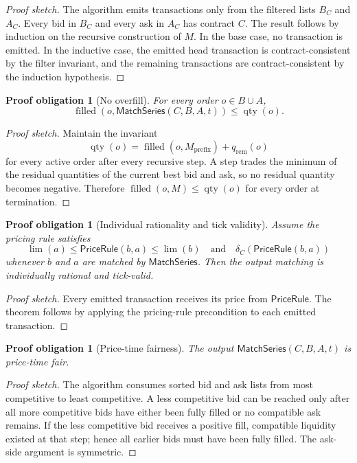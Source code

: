 \documentclass[11pt]{article}
\newtheorem{proofobligation}[definition]{Proof obligation}
\newcommand{\filled}{\operatorname{filled}}
\newcommand{\limitp}{\operatorname{lim}}
\newcommand{\qty}{\operatorname{qty}}
\begin{document}
\begin{proof}[Proof sketch]
The algorithm emits transactions only from the filtered lists \(B_C\) and \(A_C\). Every bid in \(B_C\) and every ask in \(A_C\) has contract \(C\). The result follows by induction on the recursive construction of \(M\). In the base case, no transaction is emitted. In the inductive case, the emitted head transaction is contract-consistent by the filter invariant, and the remaining transactions are contract-consistent by the induction hypothesis.
\end{proof}

\begin{proofobligation}[No overfill]
For every order \(o\in B\cup A\),
\[
\filled(o,\mathsf{MatchSeries}(C,B,A,t))\le \qty(o).
\]
\end{proofobligation}

\begin{proof}[Proof sketch]
Maintain the invariant
\[
\qty(o)=\filled(o,M_{\mathrm{prefix}})+q_{\mathrm{rem}}(o)
\]
for every active order after every recursive step. A step trades the minimum of the residual quantities of the current best bid and ask, so no residual quantity becomes negative. Therefore \(\filled(o,M)\le\qty(o)\) for every order at termination.
\end{proof}

\begin{proofobligation}[Individual rationality and tick validity]
Assume the pricing rule satisfies
\[
\limitp(a)\le\mathsf{PriceRule}(b,a)\le\limitp(b)
\quad\text{and}\quad
\delta_C(\mathsf{PriceRule}(b,a))
\]
whenever \(b\) and \(a\) are matched by \(\mathsf{MatchSeries}\). Then the output matching is individually rational and tick-valid.
\end{proofobligation}

\begin{proof}[Proof sketch]
Every emitted transaction receives its price from \(\mathsf{PriceRule}\). The theorem follows by applying the pricing-rule precondition to each emitted transaction.
\end{proof}

\begin{proofobligation}[Price-time fairness]
The output \(\mathsf{MatchSeries}(C,B,A,t)\) is price-time fair.
\end{proofobligation}

\begin{proof}[Proof sketch]
The algorithm consumes sorted bid and ask lists from most competitive to least competitive. A less competitive bid can be reached only after all more competitive bids have either been fully filled or no compatible ask remains. If the less competitive bid receives a positive fill, compatible liquidity existed at that step; hence all earlier bids must have been fully filled. The ask-side argument is symmetric.
\end{proof}
\end{document}
